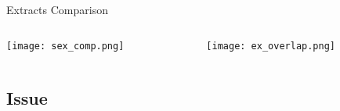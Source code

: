 \documentclass[pdf]{beamer}
\begin{document}
\begin{frame}{Extracts Comparison}
     \begin{columns}[T] %
     \begin{column}[T]{5cm} %
     \texttt{[image: sex\_comp.png]}
     \end{column}
          \begin{column}[T]{5cm} %
     \texttt{[image: ex\_overlap.png]}
    	\end{column}
     \end{columns}
\end{frame}

\subsection{Issue}
\end{document}
